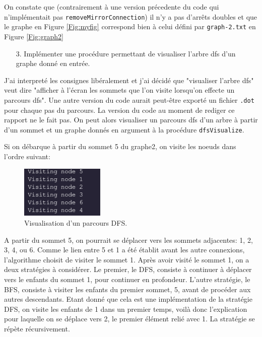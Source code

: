 \documentclass[10pt]{article} %
\begin{document}
On constate que (contrairement à une version précedente du code qui n'implémentait pas \texttt{removeMirrorConnection}) il n'y a pas d'arrêts
doubles et que le graphe en Figure \ref{Fig:myfig} correspond bien à celui défini par \texttt{graph-2.txt} en Figure \ref{Fig:graph2}


\begin{itemize}
    \item [3.] Implémenter une procédure permettant de visualiser l'arbre dfs d'un graphe donné en entrée.
\end{itemize}

J'ai interpreté les consignes libéralement et j'ai décidé que "visualiser l'arbre dfs" veut dire "afficher à l'écran les sommets que l'on visite
lorsqu'on effecte un parcours dfs". Une autre version du code aurait peut-être exporté un fichier \texttt{.dot} pour chaque pas du parcours. La version du code au moment de rediger ce
rapport ne le fait pas. On peut alors visualiser
un parcours dfs d'un arbre à partir d'un sommet et un graphe donnés en argument à la procédure \texttt{dfsVisualize}.

Si on débarque à partir du sommet 5 du graphe2, on visite les noeuds dans l'ordre suivant:

\begin{figure}[h!]
    \centering
    \includegraphics[width=4cm]{media/dfs_vis.png}
    \caption{Visualisation d'un parcours DFS.}
    \label{Fig:viz}
\end{figure}

A partir du sommet 5, on pourrait se déplacer vers les sommets adjacentes: 1, 2, 3, 4, ou 6. Comme le lien entre 5 et 1 a été établit avant les autre connexions,
l'algorithme choisit de visiter le sommet 1. Après avoir visité le sommet 1, on a deux stratégies à considérer. Le premier, le DFS, consiste à continuer à déplacer vers le
enfants du sommet 1, pour continuer en profondeur. L'autre stratégie, le BFS, consiste à visiter les enfants du premier sommet, 5, avant de procéder aux autres descendants. Etant donné
que cela est une implémentation de la stratégie DFS, on visite les enfants de 1 dans un premier temps, voilà donc l'explication pour laquelle on se déplace vers 2, le premier élément
relié avec 1. La stratégie se répète récursivement.
\end{document}

